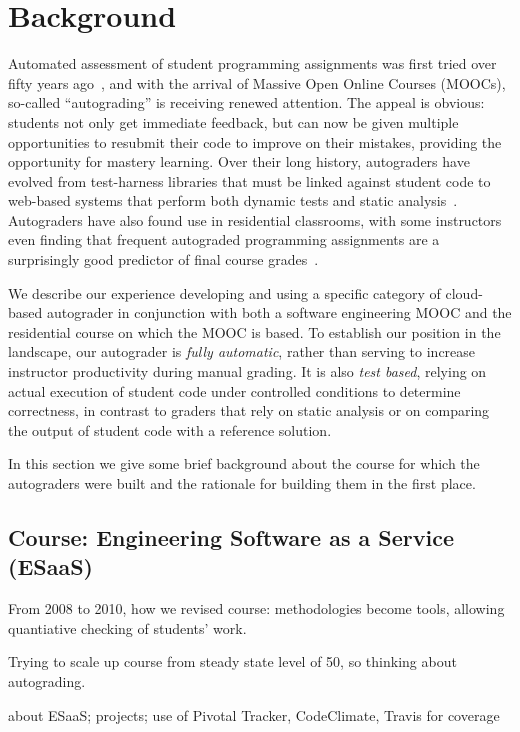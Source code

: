 \section{Background}

Automated assessment of student programming assignments was first tried
over fifty years ago~\cite{hollingsworth60}, and with the arrival of
Massive Open Online Courses (MOOCs), so-called ``autograding'' is
receiving renewed attention.  The appeal is obvious: students not only
get immediate feedback, but can now be given multiple opportunities to
resubmit their code to improve on their mistakes, providing the
opportunity for mastery learning.  Over their long history, autograders
have evolved from test-harness libraries that must be linked against
student code to web-based systems that perform both dynamic tests and static
analysis~\cite{douce-2005-autograding-survey}.  Autograders have also
found use in residential classrooms, with some instructors even finding
that frequent autograded programming assignments are a surprisingly good
predictor of final course grades~\cite{navrat2014}.

We describe our experience developing and using a specific category of
cloud-based autograder in conjunction with both a software engineering
MOOC and the residential course on which the MOOC is based.  To
establish our position in the landscape, our autograder is \emph{fully
automatic}, rather than serving to increase instructor productivity
during manual grading.  It is also \emph{test based}, relying on actual
execution of student code under controlled conditions to determine
correctness, in contrast to graders that rely on static analysis or on
comparing the output of student code with a reference solution.

In this section we give some brief background about the course for which
the autograders were built and the rationale for building them in the
first place.

\subsection{Course: Engineering Software as a Service (ESaaS)}

From 2008 to 2010, how we revised course: methodologies become tools,
allowing quantiative checking of students' work.

Trying to scale up course from steady state level of 50, so thinking
about autograding.


about ESaaS; projects; use of Pivotal Tracker, CodeClimate, Travis for coverage

